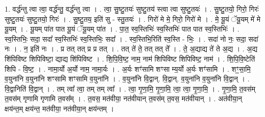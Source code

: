 \documentclass[17pt]{extarticle}
\begin{document}
1. वर्द्ध॑न्तु त्वा त्वा॒ वर्द्ध॑न्तु॒ वर्द्ध॑न्तु त्वा । . त्वा॒ सु॒ष्टु॒तयः॑ सुष्टु॒तय॑ स्त्वा त्वा सुष्टु॒तयः॑ । . सु॒ष्टु॒तयो॒ गिरो॒ गिरः॑ सुष्टु॒तयः॑ सुष्टु॒तयो॒ गिरः॑ । . सु॒ष्टु॒तय॒ इति॑ सु - स्तु॒तयः॑ । . गिरो॑ मे मे॒ गिरो॒ गिरो॑ मे । . मे॒ यू॒यं ॅयू॒यम् मे॑ मे यू॒यम् । . यू॒यम् पा॑त पात यू॒यं ॅयू॒यम् पा॑त । . पा॒त॒ स्व॒स्तिभिः॑ स्व॒स्तिभिः॑ पात पात स्व॒स्तिभिः॑ । . स्व॒स्तिभिः॒ सदा॒ सदा᳚ स्व॒स्तिभिः॑ स्व॒स्तिभिः॒ सदा᳚ । . स्व॒स्तिभि॒रिति॑ स्व॒स्ति - भिः॒ । . सदा॑ नो नः॒ सदा॒ सदा॑ नः । . न॒ इति॑ नः । . प्र तत् तत् प्र प्र तत् । . तत् ते॑ ते॒ तत् तत् ते᳚ । . ते॒ अ॒द्याद्य ते॑ ते अ॒द्य । . अ॒द्य शि॑पिविष्ट शिपिविष्टा॒ द्याद्य शि॑पिविष्ट । . शि॒पि॒वि॒ष्ट॒ नाम॒ नाम॑ शिपिविष्ट शिपिविष्ट॒ नाम॑ । . शि॒पि॒वि॒ष्टेति॑ शिपि - वि॒ष्ट॒ । . नामा॒र्यो अ॒र्यो नाम॒ नामा॒र्यः । . अ॒र्यः शꣳ॑सामि शꣳसा म्य॒र्यो अ॒र्यः शꣳ॑सामि । . शꣳ॒॒सा॒मि॒ व॒युना॑नि व॒युना॑नि शꣳसामि शꣳसामि व॒युना॑नि । . व॒युना॑नि वि॒द्वान्. वि॒द्वान्. व॒युना॑नि व॒युना॑नि वि॒द्वान् । . वि॒द्वानिति॑ वि॒द्वान् । . तम् त्वा᳚ त्वा॒ तम् तम् त्वा᳚ । . त्वा॒ गृ॒णा॒मि॒ गृ॒णा॒मि॒ त्वा॒ त्वा॒ गृ॒णा॒मि॒ । . गृ॒णा॒मि॒ त॒वस॑म् त॒वस॑म् गृणामि गृणामि त॒वस᳚म् । . त॒वस॒ मत॑वीया॒ नत॑वीयान् त॒वस॑म् त॒वस॒ मत॑वीयान् । . अत॑वीया॒न् क्षय॑न्त॒म् क्षय॑न्त॒ मत॑वीया॒ नत॑वीया॒न् क्षय॑न्तम् । \newline
\end{document}
